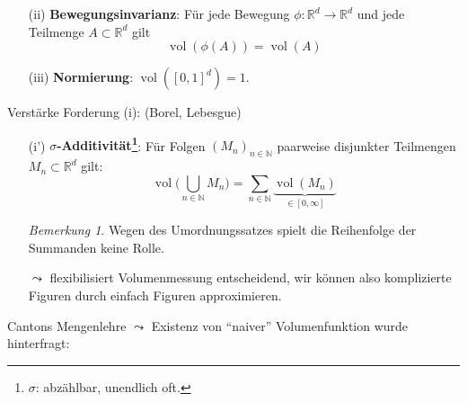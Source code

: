 \documentclass[12pt,a4paper]{article}
\theoremstyle{definition}
\theoremstyle{remark}
\newtheorem*{remark}{Bemerkung}
\newcommand{\R}{\mathbb{R}}
\newcommand{\N}{\mathbb{N}}
\newcommand{\vol}{\operatorname{vol}}
\begin{document}
\begin{enumerate}
\item[(ii)] \textbf{Bewegungsinvarianz}: Für jede Bewegung $\phi: \R^d \longrightarrow \R^d$ und jede Teilmenge $A\subset \R^d$ gilt
\begin{equation}
\vol(\phi(A)) = \vol (A)
\end{equation}
\item[(iii)] \textbf{Normierung}: $\vol([0,1]^d)=1$.
\end{enumerate}
Verstärke Forderung (i): (Borel, Lebesgue)
\begin{enumerate}
\item[(i')]\textbf{$\sigma$-Additivität\footnote{$\sigma$: abzählbar, unendlich oft.}}: Für Folgen $(M_n)_{n\in \N}$ paarweise disjunkter Teilmengen $M_n \subset \R^d$ gilt:
\begin{equation}
\vol\bigg( \bigcup_{n\in \N} M_n \bigg) = \sum_{n\in \N} \underbrace{\vol (M_n)}_{\in [0,\infty]} 
\end{equation}
\begin{remark}
Wegen des Umordnungssatzes spielt die Reihenfolge der Summanden keine Rolle.
\end{remark}
$\leadsto$ flexibilisiert Volumenmessung entscheidend, wir können also komplizierte Figuren durch einfach Figuren approximieren.
\end{enumerate}
Cantons Mengenlehre $\leadsto$ Existenz von ``naiver'' Volumenfunktion wurde hinterfragt: %
\end{document}
